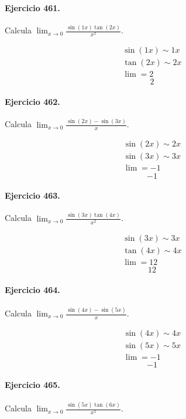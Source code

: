 \documentclass[11pt,a4paper]{article}
\begin{document}
\paragraph{Ejercicio 461.} Calcula $\displaystyle\lim_{x\to0}\frac{\sin(1x)\tan(2x)}{x^2}$.

\[
\begin{aligned}
\sin(1x)\sim 1x\\
\tan(2x)\sim 2x\\
\lim=2
\end{aligned}
\]
\[\boxed{2}\]


\paragraph{Ejercicio 462.} Calcula $\displaystyle\lim_{x\to0}\frac{\sin(2x)-\sin(3x)}{x}$.

\[
\begin{aligned}
\sin(2x)\sim 2x\\
\sin(3x)\sim 3x\\
\lim=-1
\end{aligned}
\]
\[\boxed{-1}\]


\paragraph{Ejercicio 463.} Calcula $\displaystyle\lim_{x\to0}\frac{\sin(3x)\tan(4x)}{x^2}$.

\[
\begin{aligned}
\sin(3x)\sim 3x\\
\tan(4x)\sim 4x\\
\lim=12
\end{aligned}
\]
\[\boxed{12}\]


\paragraph{Ejercicio 464.} Calcula $\displaystyle\lim_{x\to0}\frac{\sin(4x)-\sin(5x)}{x}$.

\[
\begin{aligned}
\sin(4x)\sim 4x\\
\sin(5x)\sim 5x\\
\lim=-1
\end{aligned}
\]
\[\boxed{-1}\]


\paragraph{Ejercicio 465.} Calcula $\displaystyle\lim_{x\to0}\frac{\sin(5x)\tan(6x)}{x^2}$.
\end{document}
